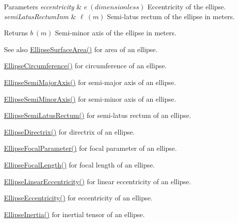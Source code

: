 \begin{DoxyParams}{Parameters}
{\em eccentricity} & $ e\ (dimensionless)$ Eccentricity of the ellipse. \\
\hline
{\em semi\+Latus\+Rectum\+Inm} & $ \ell\ (m)$ Semi-\/latus rectum of the ellipse in meters. \\
\hline
\end{DoxyParams}
\begin{DoxyReturn}{Returns}
$ b\ (m)$ Semi-\/minor axis of the ellipse in meters. 
\end{DoxyReturn}
\begin{DoxySeeAlso}{See also}
\mbox{\hyperlink{group___e_g_x_math-_geometry-2_d-_ellipse-_surface_area_ga4ce8c8323e9718ce5458f4ab7f6d823d}{Ellipse\+Surface\+Area()}} for area of an ellipse. 

\mbox{\hyperlink{group___e_g_x_math-_geometry-2_d-_ellipse-_circumference_ga4172802ac674eb53467b44928ac635c7}{Ellipse\+Circumference()}} for circumference of an ellipse. 

\mbox{\hyperlink{group___e_g_x_math-_geometry-2_d-_ellipse-_semi_major_axis_ga646a2ca065f4ac3f666a9ea22f3bb527}{Ellipse\+Semi\+Major\+Axis()}} for semi-\/major axis of an ellipse. 

\mbox{\hyperlink{group___e_g_x_math-_geometry-2_d-_ellipse-_semi_minor_axis_gae461acf3333565d69527dd86e9aa2b32}{Ellipse\+Semi\+Minor\+Axis()}} for semi-\/minor axis of an ellipse. 

\mbox{\hyperlink{group___e_g_x_math-_geometry-2_d-_ellipse-_semi_latus_rectum_gacfd1844eb4ef3d1ee3c0b460a6442ae6}{Ellipse\+Semi\+Latus\+Rectum()}} for semi-\/latus rectum of an ellipse. 

\mbox{\hyperlink{group___e_g_x_math-_geometry-2_d-_ellipse-_directrix_gace8f72a8efbc9c18d3eb689151405106}{Ellipse\+Directrix()}} for directrix of an ellipse. 

\mbox{\hyperlink{group___e_g_x_math-_geometry-2_d-_ellipse-_focal_parameter_ga4cd01a38c72c092ef9791351948bf69b}{Ellipse\+Focal\+Parameter()}} for focal parameter of an ellipse. 

\mbox{\hyperlink{group___e_g_x_math-_geometry-2_d-_ellipse-_focal_length_gab8d63de7640c880cfecaeada6f2afdac}{Ellipse\+Focal\+Length()}} for focal length of an ellipse. 

\mbox{\hyperlink{group___e_g_x_math-_geometry-2_d-_ellipse-_linear_eccentricity_gac70b3010e30aa8b73deb50fe2b9b9a91}{Ellipse\+Linear\+Eccentricity()}} for linear eccentricity of an ellipse. 

\mbox{\hyperlink{group___e_g_x_math-_geometry-2_d-_ellipse-_eccentricity_ga6a0a7fba17f782616894cfc447628c33}{Ellipse\+Eccentricity()}} for eccentricity of an ellipse. 

\mbox{\hyperlink{group___e_g_x_math-_geometry-2_d-_ellipse-_inertia_ga10a3049c2f04b50f271fb01dc62e4cf8}{Ellipse\+Inertia()}} for inertial tensor of an ellipse. 
\end{DoxySeeAlso}
